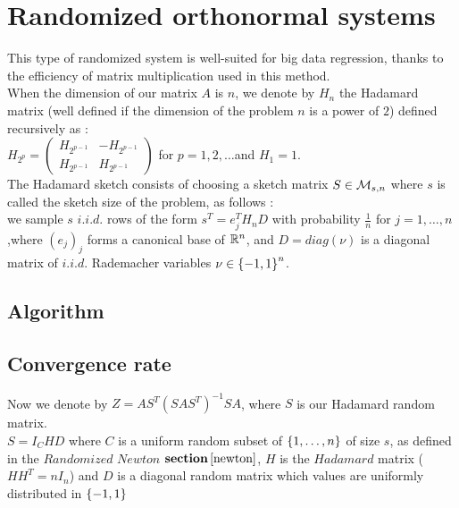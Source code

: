  

\chapter{Randomized orthonormal systems}

This type of randomized system is well-suited for big data regression, thanks to the efficiency of matrix multiplication used in this method.\\
When the dimension of our matrix $A$ is $n$, we denote by $H_{n}$ the Hadamard matrix (well defined if the dimension of the problem $n$ is a power of $2$) defined recursively as :\\

$H_{2^{p}} = \begin{pmatrix} H_{2^{p-1}} & - H_{2^{p-1}} \\
					H_{2^{p-1}} & H_{2^{p-1}}  \end{pmatrix} $ for $p=1,2,\dots$and $H_{1} = 1.$\\

The Hadamard sketch consists of choosing a sketch matrix $S \in {\mathcal M}_{s,n}$ where $s$ is called the sketch size of the problem, as follows :\\ 
we sample $s$ $i.i.d.$ rows of the form $s^{T} = e_{j}^{T}H_{n} D $ with probability $\frac 1n$ for $j = 1,\dots,n$,where $(e_{j})_{j}$ forms a canonical base of ${\mathbb R}^{n}$, and $D = diag(\nu)$ is a diagonal matrix of $i.i.d.$ Rademacher variables $\nu \in \left\{-1,1\right\}^{n}$.  


\section{Algorithm}


\section{Convergence rate}



Now we denote by $Z = A S^{T} (S A S^{T})^{-1} S A$, where $S$ is our Hadamard random matrix.\\

 $S = I_{C} H D$ where $C$ is a uniform random subset of $\left\{1,\dots,n\right\}$ of size $s$, as defined in the $Randomized \,\,Newton$ $\textbf{section}\,\ref{newton}$, $H$ is the $Hadamard$ matrix ($H H^{T} = n I_{n}$) and $D$ is a diagonal random matrix which values are uniformly distributed in $\left\{-1,1\right\}$ \\


